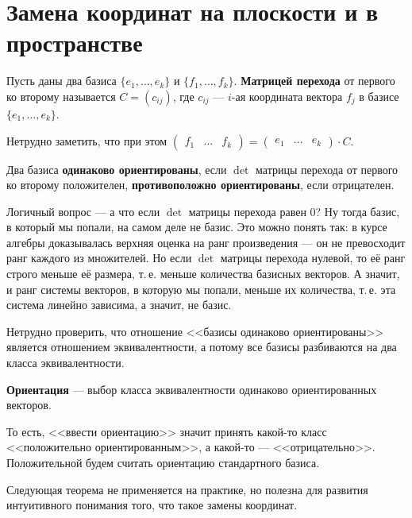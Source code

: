 \section{Замена координат на плоскости и в пространстве}

\begin{definition}
    Пусть даны два базиса $\{e_1, \ldots, e_k\}$ и $\{f_1, \ldots, f_k\}$. \textbf{Матрицей перехода} от первого ко второму называется $C = (c_{ij})$, где $c_{ij}$ --- $i$-ая координата вектора $f_j$ в базисе $\{e_1, \ldots, e_k\}$.
\end{definition}

Нетрудно заметить, что при этом $
\begin{pmatrix}
    f_1 & \ldots & f_k
\end{pmatrix} = 
\begin{pmatrix}
    e_1 & \ldots & e_k
\end{pmatrix} \cdot C
$.

\begin{definition}
    Два базиса \textbf{одинаково ориентированы}, если $\det$ матрицы перехода от первого ко второму положителен, \textbf{противоположно ориентированы}, если отрицателен.
\end{definition}

Логичный вопрос --- а что если $\det$ матрицы перехода равен $0$? Ну тогда базис, в который мы попали, на самом деле не базис. Это можно понять так: в курсе алгебры доказывалась верхняя оценка на ранг произведения --- он не превосходит ранг каждого из множителей. Но если $\det$ матрицы перехода нулевой, то её ранг строго меньше её размера, т.\,е. меньше количества базисных векторов. А значит, и ранг системы векторов, в которую мы попали, меньше их количества, т.\,е. эта система линейно зависима, а значит, не базис.

Нетрудно проверить, что отношение <<базисы одинаково ориентированы>> является отношением эквивалентности, а потому все базисы разбиваются на два класса эквивалентности.

\begin{definition}
    \textbf{Ориентация} --- выбор класса эквивалентности одинаково ориентированных векторов.
\end{definition}

То есть, <<ввести ориентацию>> значит принять какой-то класс <<положительно ориентированным>>, а какой-то --- <<отрицательно>>. Положительной будем считать ориентацию стандартного базиса.

Следующая теорема не применяется на практике, но полезна для развития интуитивного понимания того, что такое замены координат.

